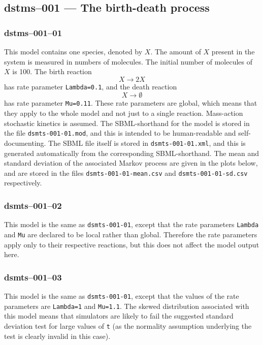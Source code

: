 
\subsection{dstms--001 --- The birth-death process}

\subsubsection{dstms--001--01} 

This model contains one species, denoted by $X$. The amount of $X$
present in the system is measured in numbers of molecules. The initial
number of molecules of $X$ is 100. The birth reaction 
\[
X \longrightarrow 2X
\] 
has rate parameter \verb$Lambda=0.1$, and the death reaction 
\[
X\longrightarrow \emptyset
\]
has rate parameter \verb$Mu=0.11$. These
rate parameters are global, which means that they apply to the whole
model and not just to a single reaction. Mass-action stochastic
kinetics is assumed. The SBML-shorthand for the model is stored in the
file \verb$dsmts-001-01.mod$, and this is intended to be
human-readable and self-documenting. The SBML file itself is stored in
\verb$dsmts-001-01.xml$, and this is generated automatically from the
corresponding SBML-shorthand. The mean and standard deviation of the
associated Markov process are given in the plots below, and are stored
in the files \verb$dsmts-001-01-mean.csv$ and
\verb$dsmts-001-01-sd.csv$ respectively.


\subsubsection{dsmts--001--02}

This model is the same as \texttt{dsmts-001-01}, except that the rate
parameters \verb$Lambda$ and \verb$Mu$ are declared to be local rather
than global. Therefore the rate parameters apply only to their
respective reactions, but this does not affect the model output
here. 


\subsubsection{dsmts--001--03}

This model is the same as \texttt{dsmts-001-01}, except that the
values of the rate parameters are \verb$Lambda=1$ and
\verb$Mu=1.1$. The skewed distribution associated with this model
means that simulators are likely to fail the suggested standard
deviation test for large values of \verb$t$ (as the normality
assumption underlying the test is clearly invalid in this
case).

